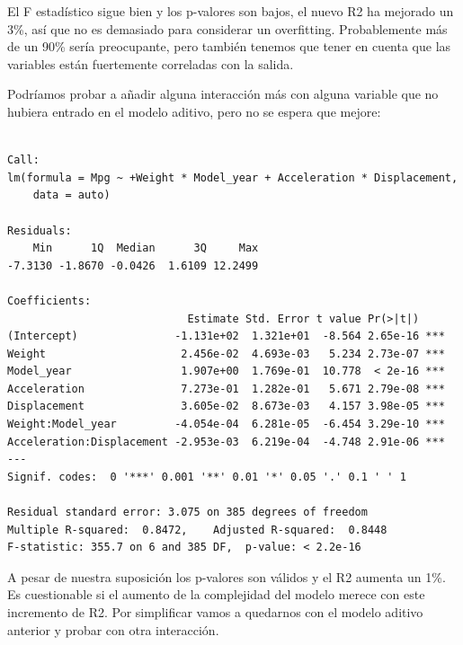 \documentclass[
]{article}
\newenvironment{Shaded}{\begin{snugshade}}{\end{snugshade}}
\newcommand{\DataTypeTok}[1]{\textcolor[rgb]{0.13,0.29,0.53}{#1}}
\newcommand{\KeywordTok}[1]{\textcolor[rgb]{0.13,0.29,0.53}{\textbf{#1}}}
\newcommand{\NormalTok}[1]{#1}
\newcommand{\OperatorTok}[1]{\textcolor[rgb]{0.81,0.36,0.00}{\textbf{#1}}}
\newcommand{\StringTok}[1]{\textcolor[rgb]{0.31,0.60,0.02}{#1}}
\begin{document}
El F estadístico sigue bien y los p-valores son bajos, el nuevo R2 ha
mejorado un 3\%, así que no es demasiado para considerar un overfitting.
Probablemente más de un 90\% sería preocupante, pero también tenemos que
tener en cuenta que las variables están fuertemente correladas con la
salida.

Podríamos probar a añadir alguna interacción más con alguna variable que
no hubiera entrado en el modelo aditivo, pero no se espera que mejore:

\begin{Shaded}
\end{Shaded}

\begin{verbatim}

Call:
lm(formula = Mpg ~ +Weight * Model_year + Acceleration * Displacement, 
    data = auto)

Residuals:
    Min      1Q  Median      3Q     Max 
-7.3130 -1.8670 -0.0426  1.6109 12.2499 

Coefficients:
                            Estimate Std. Error t value Pr(>|t|)    
(Intercept)               -1.131e+02  1.321e+01  -8.564 2.65e-16 ***
Weight                     2.456e-02  4.693e-03   5.234 2.73e-07 ***
Model_year                 1.907e+00  1.769e-01  10.778  < 2e-16 ***
Acceleration               7.273e-01  1.282e-01   5.671 2.79e-08 ***
Displacement               3.605e-02  8.673e-03   4.157 3.98e-05 ***
Weight:Model_year         -4.054e-04  6.281e-05  -6.454 3.29e-10 ***
Acceleration:Displacement -2.953e-03  6.219e-04  -4.748 2.91e-06 ***
---
Signif. codes:  0 '***' 0.001 '**' 0.01 '*' 0.05 '.' 0.1 ' ' 1

Residual standard error: 3.075 on 385 degrees of freedom
Multiple R-squared:  0.8472,    Adjusted R-squared:  0.8448 
F-statistic: 355.7 on 6 and 385 DF,  p-value: < 2.2e-16
\end{verbatim}

A pesar de nuestra suposición los p-valores son válidos y el R2 aumenta
un 1\%. Es cuestionable si el aumento de la complejidad del modelo
merece con este incremento de R2. Por simplificar vamos a quedarnos con
el modelo aditivo anterior y probar con otra interacción.
\end{document}
